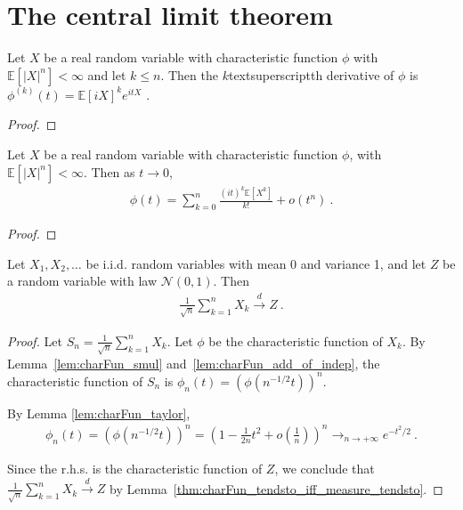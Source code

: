 \chapter{The central limit theorem}

\begin{lemma}\label{lem:deriv_charFun}
Let $X$ be a real random variable with characteristic function $\phi$ with $\mathbb{E}[\vert X \vert^n] < \infty$ and let $k \le n$. Then the $k$textsuperscript{th} derivative of $\phi$ is 
$\phi^{(k)}(t) = \mathbb{E}[i X]^k e^{i t X}$ \: .
\end{lemma}

\begin{proof}
\end{proof}

\begin{lemma}\label{lem:charFun_taylor}
Let $X$ be a real random variable with characteristic function $\phi$, with $\mathbb{E}[\vert X \vert^n] < \infty$. Then as $t \to 0$,
\begin{align*}
\phi(t) = \sum_{k=0}^n \frac{(it)^k \mathbb{E}[X^k]}{k!} + o(t^n)
\: .
\end{align*}
\end{lemma}

\begin{proof}
\end{proof}

\begin{theorem}\label{clt}
Let $X_1, X_2, \ldots$ be i.i.d. random variables with mean 0 and variance 1, and let $Z$ be a random variable with law $\mathcal N(0,1)$. Then
\begin{align*}
\frac{1}{\sqrt{n}}\sum_{k=1}^n X_k \xrightarrow{d} Z \: .
\end{align*}
\end{theorem}

\begin{proof}
Let $S_n = \frac{1}{\sqrt{n}}\sum_{k=1}^n X_k$. Let $\phi$ be the characteristic function of $X_k$. By Lemma~\ref{lem:charFun_smul} and~\ref{lem:charFun_add_of_indep}, the characteristic function of $S_n$ is $\phi_n(t) = (\phi(n^{-1/2}t))^n$.

By Lemma \ref{lem:charFun_taylor},
\begin{align*}
\phi_n(t) = (\phi(n^{-1/2}t))^n = \left(1 - \frac{1}{2n}t^2 + o(\frac{1}{n})\right)^n \to_{n \to +\infty} e^{-t^2/2} \: .
\end{align*}

Since the r.h.s. is the characteristic function of $Z$, we conclude that $\frac{1}{\sqrt{n}}\sum_{k=1}^n X_k \xrightarrow{d} Z$ by Lemma~\ref{thm:charFun_tendsto_iff_measure_tendsto}.
\end{proof}
